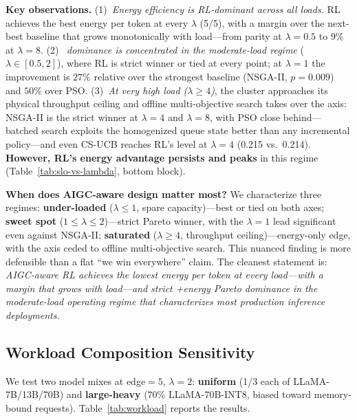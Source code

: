 \textbf{Key observations.}
(1)~\emph{Energy efficiency is RL-dominant across all loads.}
RL achieves the best energy per token at every $\lambda$
(5/5), with a margin over the next-best baseline that grows
monotonically with load---from parity at $\lambda{=}0.5$ to
$9\%$ at $\lambda{=}8$.
(2)~\emph{\slo{} dominance is concentrated in the
moderate-load regime} ($\lambda \in [0.5, 2]$), where RL is
strict winner or tied at every point; at $\lambda{=}1$ the
improvement is $27\%$ relative over the strongest baseline
(NSGA-II, $p=0.009$) and $50\%$ over PSO.
(3)~\emph{At very high load ($\lambda \ge 4$)}, the cluster
approaches its physical throughput ceiling and offline
multi-objective search takes over the \slo{} axis: NSGA-II is
the strict winner at $\lambda{=}4$ and $\lambda{=}8$, with
PSO close behind---batched search exploits the homogenized
queue state better than any incremental policy---and even
CS-UCB reaches
RL's \slo{} level at $\lambda{=}4$ (0.215 vs.\ 0.214).
\textbf{However, RL's
energy advantage persists and peaks} in this regime
(Table~\ref{tab:slo-vs-lambda}, bottom block).

\textbf{When does AIGC-aware design matter most?} We
characterize three regimes:
\textbf{under-loaded} ($\lambda \le 1$, spare
capacity)---best or tied on both axes;
\textbf{sweet spot} ($1 \le \lambda \le 2$)---strict Pareto
winner, with the $\lambda{=}1$ \slo{} lead significant even
against NSGA-II;
\textbf{saturated} ($\lambda \ge 4$, throughput
ceiling)---energy-only edge, with the \slo{} axis ceded to
offline multi-objective search. This nuanced finding is more
defensible than a flat ``we
win everywhere'' claim. The cleanest statement is:
\emph{AIGC-aware RL achieves the lowest energy per token at
every load---with a margin that grows with load---and strict
\slo{}+energy
Pareto dominance in the moderate-load operating regime that
characterizes most production inference deployments.}

\subsection{Workload Composition Sensitivity}
\label{sec:workload}

We test two model mixes at edge${=}5$, $\lambda{=}2$: \textbf{uniform}
(1/3 each of LLaMA-7B/13B/70B) and \textbf{large-heavy} (70\%
LLaMA-70B-INT8, biased toward memory-bound requests).
Table~\ref{tab:workload} reports the results.

